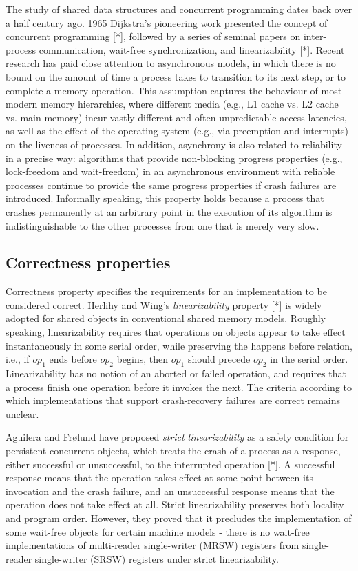 \documentclass{article}
\begin{document}
The study of shared data structures and concurrent programming dates back over a half century ago. 1965 Dijkstra's pioneering work presented the concept of concurrent programming [*], followed by a series of seminal papers on inter-process communication, wait-free synchronization, and linearizability [*].
Recent research has paid close attention to asynchronous models, in which there is no bound on the amount of time a process takes to transition to its next step, or to complete a memory operation. This assumption captures the behaviour of most modern memory hierarchies, where different media (e.g., L1 cache vs. L2 cache vs. main memory) incur vastly different and often unpredictable access latencies, as well as the effect of the operating system (e.g., via preemption and interrupts) on the liveness of processes. In addition, asynchrony is also related to reliability in a precise way: algorithms that provide non-blocking progress properties (e.g., lock-freedom and wait-freedom) in an asynchronous environment with reliable processes continue to provide the same progress properties if crash failures are introduced. Informally speaking, this property holds because a process that crashes permanently at an arbitrary point in the execution of its algorithm is indistinguishable to the other processes from one that is merely very slow.

\subsection{Correctness properties}
Correctness property specifies the requirements for an implementation to be considered correct. Herlihy and Wing’s \emph{linearizability} property [*] is widely adopted for shared objects in conventional shared memory models.  Roughly speaking, linearizability requires that operations on objects appear to take effect instantaneously in some serial order, while preserving the happens before relation, i.e., if $op_1$ ends before $op_2$ begins, then $op_1$ should precede $op_2$ in the serial order. Linearizability has no notion of an aborted or failed operation, and requires that a process finish one operation before it invokes the next. The criteria according to which implementations that support crash-recovery failures are correct remains unclear.

Aguilera and Frølund have proposed \emph{strict linearizability} as a safety condition for persistent concurrent objects, which treats the crash of a process as a response, either successful or unsuccessful, to the interrupted operation [*]. A successful response means that the operation takes effect at some point between its invocation and the crash failure, and an unsuccessful response means that the operation does not take effect at all. Strict linearizability preserves both locality and program order. However, they proved that it precludes the implementation of some wait-free objects for certain machine models - there is no wait-free implementations of multi-reader single-writer (MRSW) registers from single-reader single-writer (SRSW) registers under strict linearizability.
\end{document}
